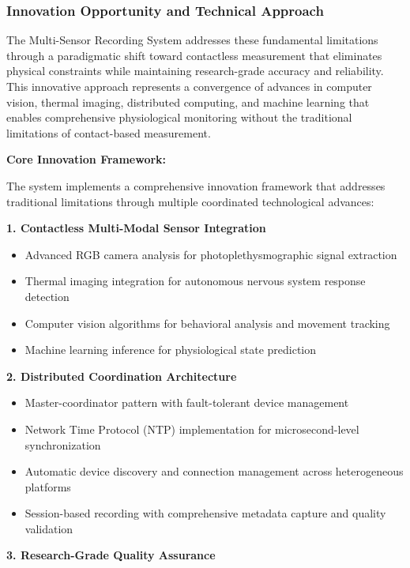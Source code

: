 \documentclass[11pt,a4paper]{report}
\begin{document}
\subsubsection{Innovation Opportunity and Technical Approach}

The Multi-Sensor Recording System addresses these fundamental limitations through a paradigmatic shift toward
contactless measurement that eliminates physical constraints while maintaining research-grade accuracy and reliability.
This innovative approach represents a convergence of advances in computer vision, thermal imaging, distributed
computing, and machine learning that enables comprehensive physiological monitoring without the traditional limitations
of contact-based measurement.

\textbf{Core Innovation Framework:}

The system implements a comprehensive innovation framework that addresses traditional limitations through multiple
coordinated technological advances:

\textbf{1. Contactless Multi-Modal Sensor Integration}

\begin{itemize}
\item Advanced RGB camera analysis for photoplethysmographic signal extraction
\item Thermal imaging integration for autonomous nervous system response detection
\item Computer vision algorithms for behavioral analysis and movement tracking
\item Machine learning inference for physiological state prediction

\end{itemize}
\textbf{2. Distributed Coordination Architecture}

\begin{itemize}
\item Master-coordinator pattern with fault-tolerant device management
\item Network Time Protocol (NTP) implementation for microsecond-level synchronization
\item Automatic device discovery and connection management across heterogeneous platforms
\item Session-based recording with comprehensive metadata capture and quality validation

\end{itemize}
\textbf{3. Research-Grade Quality Assurance}
\end{document}
